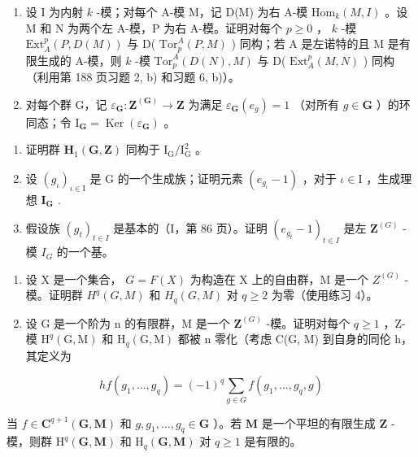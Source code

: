\begin{enumerate}
\def\labelenumi{\arabic{enumi})}
\setcounter{enumi}{2}
\item
  设 I 为内射 \(k\) -模；对每个 A-模 M，记 D(M) 为右 A-模 \(\mathrm{Hom}_{k}(M, I)\) 。设 M 和 N 为两个左 A-模，P 为右 A-模。证明对每个 \(p \geqslant 0\) ， \(k\) -模 \(\mathrm{Ext}_{A}^{p}(P, D(M))\) 与 D( \(\mathrm{Tor}_{p}^{A}(P, M)\) ) 同构；若 A 是左诺特的且 M 是有限生成的 A-模，则 \(k\) -模 \(\mathrm{Tor}_{p}^{A}(D(N), M)\) 与 D( \(\mathrm{Ext}_{A}^{p}(M, N)\) ) 同构（利用第 188 页习题 2, b) 和习题 6, b)）。
\item
  对每个群 G，记 \(\varepsilon_{\mathbf{G}}: \mathbf{Z}^{(\mathbf{G})} \to \mathbf{Z}\) 为满足 \(\varepsilon_{\mathbf{G}}(e_g) = 1\) （对所有 \(g \in \mathbf{G}\) ）的环同态；令 \(\mathrm{I}_{\mathbf{G}} = \operatorname{Ker}(\varepsilon_{\mathbf{G}})\) 。
\end{enumerate}

\begin{enumerate}
\def\labelenumi{\alph{enumi})}
\item
  证明群 \(\mathbf{H}_{1}(\mathbf{G},\mathbf{Z})\) 同构于 \(\mathrm{I}_{\mathrm{G}} / \mathrm{I}_{\mathrm{G}}^{2}\) 。
\item
  设 \((g_{\iota})_{\iota \in \mathrm{I}}\) 是 G 的一个生成族；证明元素 \((e_{g_{\iota}} - 1)\) ，对于 \(\iota \in \mathrm{I}\) ，生成理想 \(\mathbf{I}_{\mathbf{G}}\) .
\item
  假设族 \((g_{t})_{t\in I}\) 是基本的（I，第 86 页）。证明 \((e_{g_t} - 1)_{t\in I}\) 是左 \(\mathbf{Z}^{(G)}\) -模 \(I_G\) 的一个基。
\end{enumerate}

\begin{enumerate}
\def\labelenumi{\arabic{enumi})}
\setcounter{enumi}{4}
\item
  设 X 是一个集合， \(G = F(X)\) 为构造在 X 上的自由群，M 是一个 \(Z^{(G)}\) -模。证明群 \(H^q(G, M)\) 和 \(H_q(G, M)\) 对 \(q \geqslant 2\) 为零（使用练习 4）。
\item
  设 G 是一个阶为 n 的有限群，M 是一个 \(\mathbf{Z}^{(G)}\) -模。证明对每个 \(q \geqslant 1\) ，Z-模 \(\mathrm{H}^{q}(\mathrm{G}, \mathrm{M})\) 和 \(\mathrm{H}_{q}(\mathrm{G}, \mathrm{M})\) 都被 n 零化（考虑 C(G, M) 到自身的同伦 h，其定义为
\end{enumerate}

\[
h f (g _ {1}, \dots , g _ {q}) = (- 1) ^ {q} \sum_ {g \in G} f (g _ {1}, \dots , g _ {q}, g)
\]

当 \(f \in \mathbf{C}^{q+1}(\mathbf{G}, \mathbf{M})\) 和 \(g, g_1, \ldots, g_q \in \mathbf{G}\) ）。若 \(\mathbf{M}\) 是一个平坦的有限生成 \(\mathbf{Z}\) -模，则群 \(\mathrm{H}^q(\mathbf{G}, \mathbf{M})\) 和 \(\mathrm{H}_q(\mathbf{G}, \mathbf{M})\) 对 \(q \geqslant 1\) 是有限的。

